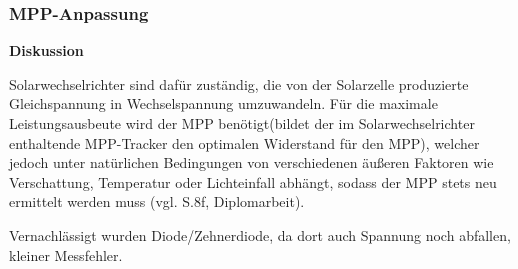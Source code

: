     \subsubsection{MPP-Anpassung}                                       %
        \textbf{Diskussion}
        \newline
        \par Solarwechselrichter sind dafür zuständig, die von der Solarzelle produzierte Gleichspannung in Wechselspannung umzuwandeln. Für die maximale Leistungsausbeute wird der MPP benötigt(bildet der im Solarwechselrichter enthaltende MPP-Tracker den optimalen Widerstand für den MPP), welcher jedoch unter natürlichen Bedingungen von verschiedenen äußeren Faktoren wie Verschattung, Temperatur oder Lichteinfall abhängt, sodass der MPP stets neu ermittelt werden muss (vgl. S.8f, Diplomarbeit). 
        \par Vernachlässigt wurden Diode/Zehnerdiode, da dort auch Spannung noch abfallen, kleiner Messfehler.
